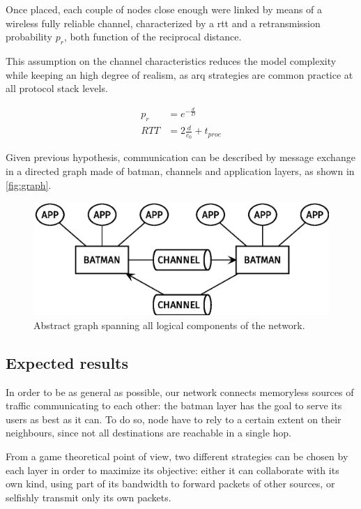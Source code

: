 \documentclass[conference]{IEEEtran}
\begin{document}
Once placed, each couple of nodes close enough were linked by means of a
wireless fully reliable channel, characterized by a \gls{rtt} and a
retransmission probability $p_r$, both function of the reciprocal distance.

This assumption on the channel characteristics reduces the model complexity
while keeping an high degree of realism, as \gls{arq} strategies are common
practice at all protocol stack levels.

\begin{equation}
  \begin{split}
    p_r & = e^{-\frac{d}{D}} \\
    RTT &= 2 \frac{d}{c_0} + t_{proc}
  \end{split}
\end{equation}

Given previous hypothesis, communication can be described by message exchange in
a directed graph made of \gls{batman}, channels and application layers, as shown
in \autoref{fig:graph}.

\begin{figure}[h]
  \centering
  \includegraphics[width=\linewidth]{figures/layers_diagram}
  \caption{Abstract graph spanning all logical components of the network.}
  \label{fig:graph}
\end{figure}

\subsection{Expected results}

In order to be as general as possible, our network connects memoryless sources
of traffic communicating to each other: the \gls{batman} layer has the goal to
serve its users as best as it can. To do so, node have to rely to a certain
extent on their neighbours, since not all destinations are reachable in a single
hop.

From a game theoretical point of view, two different strategies can be chosen by
each layer in order to maximize its objective: either it can collaborate with
its own kind, using part of its bandwidth to forward packets of other sources,
or selfishly transmit only its own packets.
\end{document}
